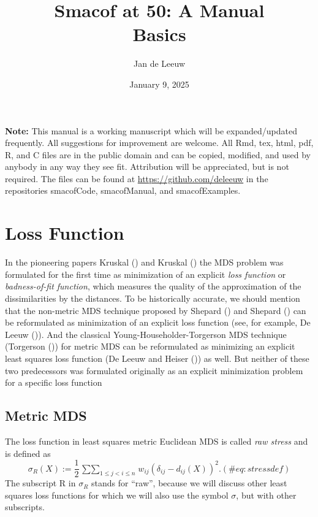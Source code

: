 \documentclass[
  12pt,
  letterpaper,
  DIV=11,
  numbers=noendperiod]{scrartcl}
\title{Smacof at 50: A Manual\\
Basics}
\author{Jan de Leeuw}
\date{January 9, 2025}
\newcommand{\sectionbreak}{\clearpage}
\renewcommand*\contentsname{Table of contents}
\newcommand\contentsname{Table of contents}
\theoremstyle{plain}
\theoremstyle{remark}
\begin{document}
\maketitle

\renewcommand*\contentsname{Table of contents}
{
\hypersetup{linkcolor=}
\setcounter{tocdepth}{3}
\tableofcontents
}

\textbf{Note:} This manual is a working manuscript which will be
expanded/updated frequently. All suggestions for improvement are
welcome. All Rmd, tex, html, pdf, R, and C files are in the public
domain and can be copied, modified, and used by anybody in any way they
see fit. Attribution will be appreciated, but is not required. The files
can be found at \url{https://github.com/deleeuw} in the repositories
smacofCode, smacofManual, and smacofExamples.

\sectionbreak

\section{Loss Function}\label{loss-function}

In the pioneering papers Kruskal () and
Kruskal () the MDS problem was
formulated for the first time as minimization of an explicit \emph{loss
function} or \emph{badness-of-fit function}, which measures the quality
of the approximation of the dissimilarities by the distances. To be
historically accurate, we should mention that the non-metric MDS
technique proposed by Shepard () and
Shepard () can be reformulated as
minimization of an explicit loss function (see, for example, De Leeuw
()). And the classical
Young-Householder-Torgerson MDS technique (Torgerson
()) for metric MDS can be reformulated
as minimizing an explicit least squares loss function (De Leeuw and
Heiser ()) as well. But neither
of these two predecessors was formulated originally as an explicit
minimization problem for a specific loss function

\subsection{Metric MDS}\label{metric-mds}

The loss function in least squares metric Euclidean MDS is called
\emph{raw stress} and is defined as \begin{equation}
\sigma_R(X):=\frac12\mathop{\sum\sum}_{1\leq j<i\leq n}w_{ij}(\delta_{ij}-d_{ij}(X))^2.
(\#eq:stressdef)
\end{equation} The subscript R in \(\sigma_R\) stands for ``raw'',
because we will discuss other least squares loss functions for which we
will also use the symbol \(\sigma\), but with other subscripts.
\end{document}
